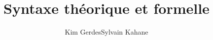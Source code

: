 \author{Kim Gerdes\lastand Sylvain Kahane}
\title{Syntaxe théorique et formelle}
\renewcommand{\lsSeries}{tbls}
\renewcommand{\lsSeriesNumber}{7}
\renewcommand{\lsID}{000}

